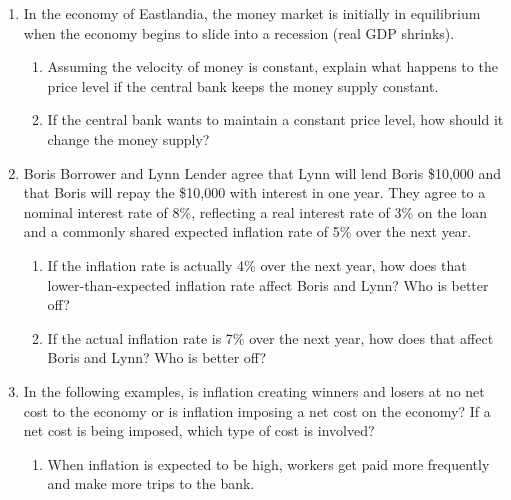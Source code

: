 \documentclass{article}
\begin{document}
\begin{enumerate}
\item In the economy of Eastlandia, the money market is initially in equilibrium when the economy begins to slide into a recession (real GDP shrinks). 

	\begin{enumerate}
	
	\item Assuming the velocity of money is constant, explain what happens to the price level if the central bank keeps the money supply constant. 
	
	\item If the central bank wants to maintain a constant price level, how should it change the money supply?
	
	\end{enumerate}
	
\item Boris Borrower and Lynn Lender agree that Lynn will lend Boris \$10,000 and that Boris will repay the \$10,000 with interest in one year. They agree to a nominal interest rate of 8\%, reflecting a real interest rate of 3\% on the loan and a commonly shared expected inflation rate of 5\% over the next year.

	\begin{enumerate}
	
	\item If the inflation rate is actually 4\% over the next year, how does that lower-than-expected inflation rate affect Boris and Lynn? Who is better off?
	
	\item If the actual inflation rate is 7\% over the next year, how does that affect Boris and Lynn? Who is better off?
	
	\end{enumerate}
	
\item In the following examples, is inflation creating winners and losers at no net cost to the economy or is inflation imposing a net cost on the economy? If a net cost is being imposed, which type of cost is involved?

	\begin{enumerate}
	
	\item When inflation is expected to be high, workers get paid more frequently and make more trips to the bank.
	
	

\end{enumerate}
\end{enumerate}
\end{document}

